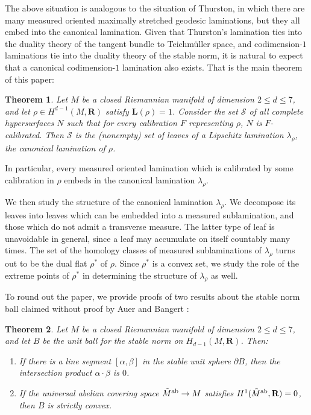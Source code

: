 \documentclass[reqno,11pt]{amsart}
\newcommand{\RR}{\mathbf{R}}
\newcommand{\Comass}{\mathbf L}
\newcommand{\dfn}[1]{\emph{#1}\index{#1}}
\newtheorem{theorem}{Theorem}[section]
\theoremstyle{definition}
\numberwithin{equation}{section}
\begin{document}
The above situation is analogous to the situation of Thurston, in which there are many measured oriented maximally stretched geodesic laminations, but they all embed into the canonical lamination.
Given that Thurston's lamination ties into the duality theory of the tangent bundle to Teichm\"uller space, and codimension-$1$ laminations tie into the duality theory of the stable norm, it is natural to expect that a canonical codimension-$1$ lamination also exists.
That is the main theorem of this paper:

\begin{theorem}\label{existence of calibrated lam}
Let $M$ be a closed Riemannian manifold of dimension $2 \leq d \leq 7$, and let $\rho \in H^{d - 1}(M, \RR)$ satisfy $\Comass(\rho) = 1$.
Consider the set $\mathscr S$ of all complete hypersurfaces $N$ such that for every calibration $F$ representing $\rho$, $N$ is $F$-calibrated.
Then $\mathscr S$ is the (nonempty) set of leaves of a Lipschitz lamination $\lambda_\rho$, the \dfn{canonical lamination} of $\rho$.
\end{theorem}

In particular, every measured oriented lamination which is calibrated by some calibration in $\rho$ embeds in the canonical lamination $\lambda_\rho$.

We then study the structure of the canonical lamination $\lambda_\rho$.
We decompose its leaves into leaves which can be embedded into a measured sublamination, and those which do not admit a transverse measure.
The latter type of leaf is unavoidable in general, since a leaf may accumulate on itself countably many times.
The set of the homology classes of measured sublaminations of $\lambda_\rho$ turns out to be the dual flat $\rho^*$ of $\rho$.
Since $\rho^*$ is a convex set, we study the role of the extreme points of $\rho^*$ in determining the structure of $\lambda_\rho$ as well.

To round out the paper, we provide proofs of two results about the stable norm ball claimed without proof by Auer and Bangert \cite[Theorems 6 and 7]{Auer01}:

\begin{theorem}
Let $M$ be a closed Riemannian manifold of dimension $2 \leq d \leq 7$, and let $B$ be the unit ball for the stable norm on $H_{d - 1}(M, \RR)$.
Then:
\begin{enumerate}
\item If there is a line segment $[\alpha, \beta]$ in the stable unit sphere $\partial B$, then the intersection product $\alpha \cdot \beta$ is $0$.
\item If the universal abelian covering space $\tilde M^{\rm ab} \to M$ satisfies $H^1(\tilde M^{\rm ab}, \RR) = 0$, then $B$ is strictly convex.
\end{enumerate}
\end{theorem}
\end{document}
